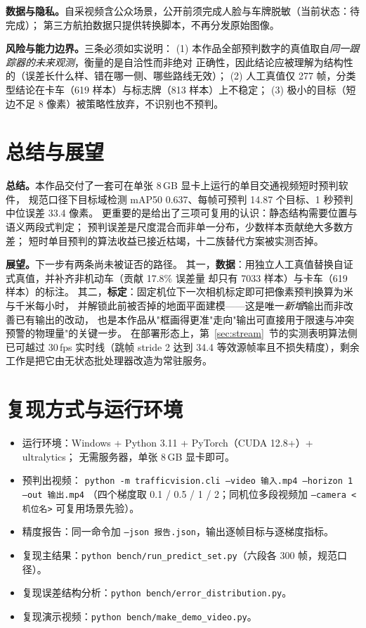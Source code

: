 \documentclass[11pt,a4paper]{ctexart}
\begin{document}
\textbf{数据与隐私。}自采视频含公众场景，公开前须完成人脸与车牌脱敏（当前状态：待完成）；
第三方航拍数据只提供转换脚本，不再分发原始图像。

\textbf{风险与能力边界。}三条必须如实说明：
(1) 本作品全部预判数字的真值取自\emph{同一跟踪器的未来观测}，衡量的是自洽性而非绝对
正确性，因此结论应被理解为结构性的（误差长什么样、错在哪一侧、哪些路线无效）；
(2) 人工真值仅 277 帧，分类型结论在卡车（619 样本）与标志牌（813 样本）上不稳定；
(3) 极小的目标（短边不足 8 像素）被策略性放弃，不识别也不预判。

\section{总结与展望}

\textbf{总结。}本作品交付了一套可在单张 8\,GB 显卡上运行的单目交通视频短时预判软件，
规范口径下目标域检测 mAP50 0.637、每帧可预判 14.87 个目标、1 秒预判中位误差 33.4 像素。
更重要的是给出了三项可复用的认识：静态结构需要位置与语义两段式判定；
预判误差是尺度混合而非单一分布，少数样本贡献绝大多数方差；
短时单目预判的算法收益已接近枯竭，十二族替代方案被实测否掉。

\textbf{展望。}下一步有两条尚未被证否的路径。
其一，\textbf{数据}：用独立人工真值替换自证式真值，并补齐非机动车（贡献 17.8\% 误差量
却只有 7033 样本）与卡车（619 样本）的标注。
其二，\textbf{标定}：固定机位下一次相机标定即可把像素预判换算为米与千米每小时，
并解锁此前被否掉的地面平面建模——这是唯一\emph{新增}输出而非改善已有输出的改动，
也是本作品从"框画得更准"走向"输出可直接用于限速与冲突预警的物理量"的关键一步。
在部署形态上，第~\ref{sec:stream}~节的实测表明算法侧已可越过 30\,fps 实时线（跳帧 stride 2 达到
34.4 等效源帧率且不损失精度），剩余工作是把它由无状态批处理器改造为常驻服务。

\appendix
\section{复现方式与运行环境}

\begin{itemize}\setlength{\itemsep}{1pt}
  \item 运行环境：Windows + Python 3.11 + PyTorch（CUDA 12.8+）+ ultralytics；
        无需服务器，单张 8\,GB 显卡即可。
  \item 预判出视频：
        \texttt{python -m trafficvision.cli --video 输入.mp4 --horizon 1 --out 输出.mp4}
        （四个梯度取 0.1 / 0.5 / 1 / 2；同机位多段视频加 \texttt{--camera <机位名>}
        可复用场景先验）。
  \item 精度报告：同一命令加 \texttt{--json 报告.json}，输出逐帧目标与逐梯度指标。
  \item 复现主结果：\texttt{python bench/run\_predict\_set.py}（六段各 300 帧，规范口径）。
  \item 复现误差结构分析：\texttt{python bench/error\_distribution.py}。
  \item 复现演示视频：\texttt{python bench/make\_demo\_video.py}。
\end{itemize}
\end{document}
